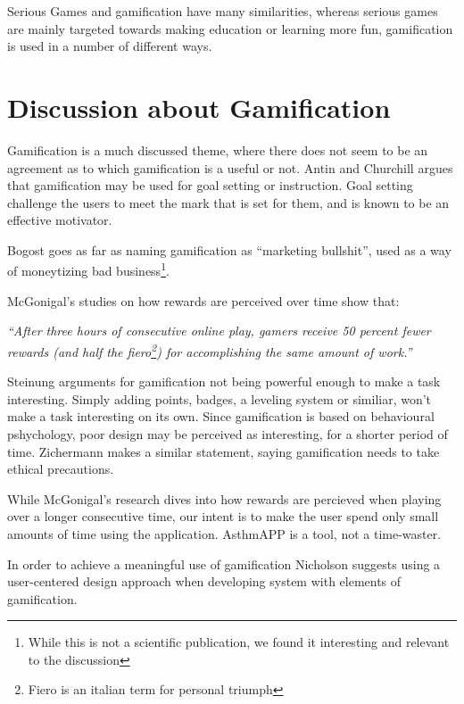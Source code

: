 Serious Games and gamification have many similarities, whereas serious games are mainly targeted towards making education or learning more fun, gamification is used in a number of different ways. 


\section{Discussion about Gamification}
\label{sec:gamificationdiscussion}

Gamification is a much discussed theme, where there does not seem to be an agreement as to which gamification is a useful or not. 
Antin and Churchill argues that gamification may be used for goal setting or instruction\cite{antin2011badges}. Goal setting challenge the users to meet the mark that is set for them, and is known to be an effective motivator\cite{ling2005using}. 

Bogost goes as far as naming gamification as ``marketing bullshit'', used as a way of moneytizing bad business\cite{gamificationbullshit}\footnote{While this is not a scientific publication, we found it interesting and relevant to the discussion}.

McGonigal's studies on how rewards are perceived over time show that: 

\textit{``After three hours of consecutive online play, gamers receive 50 percent fewer rewards (and half the fiero\footnote{Fiero is an italian term for personal triumph\cite{ekman2007emotions}}) for accomplishing the same amount of work.''}\cite{jane2011reality}

Steinung arguments for gamification not being powerful enough to make a task interesting\cite{steinung2012interessante}. Simply adding points, badges, a leveling system or similiar, won't make a task interesting on its own. Since gamification is based on behavioural pshychology, poor design may be perceived as interesting, for a shorter period of time\cite{steinung2012interessante}. Zichermann makes a similar statement, saying gamification needs to take ethical precautions\cite{zichermann2011gamification}.

While McGonigal's research dives into how rewards are percieved when playing over a longer consecutive time, our intent is to make the user spend only small amounts of time using the application. AsthmAPP is a tool, not a time-waster.

In order to achieve a meaningful use of gamification Nicholson\cite{nicholson2012user} suggests using a user-centered design approach\cite{usercentereddesign} when developing system with elements of gamification. 


